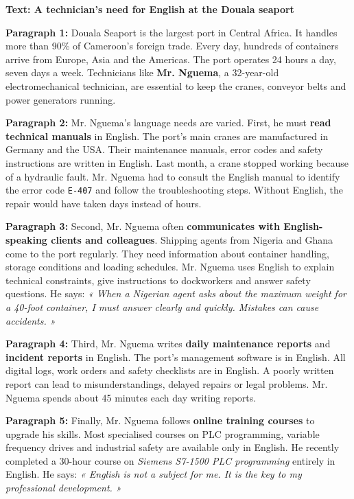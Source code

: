 \documentclass[11pt]{article}
\newcommand{\cle}[1]{{\popxbold\color{popdark}#1}}
\begin{document}
\begin{popfigure}
\textbf{Text: A technician's need for English at the Douala seaport}

\medskip
\noindent
\textbf{Paragraph 1:} 
Douala Seaport is the largest port in Central Africa. It handles more than 90\% of Cameroon's foreign trade. Every day, hundreds of containers arrive from Europe, Asia and the Americas. The port operates 24 hours a day, seven days a week. Technicians like \textbf{Mr. Nguema}, a 32-year-old electromechanical technician, are essential to keep the cranes, conveyor belts and power generators running.

\medskip
\noindent
\textbf{Paragraph 2:}
Mr. Nguema's \cle{language needs} are varied. First, he must \textbf{read technical manuals} in English. The port's main cranes are manufactured in Germany and the USA. Their maintenance manuals, error codes and safety instructions are written in English. Last month, a crane stopped working because of a hydraulic fault. Mr. Nguema had to consult the English manual to identify the error code \texttt{E-407} and follow the troubleshooting steps. Without English, the repair would have taken days instead of hours.

\medskip
\noindent
\textbf{Paragraph 3:}
Second, Mr. Nguema often \textbf{communicates with English-speaking clients and colleagues}. Shipping agents from Nigeria and Ghana come to the port regularly. They need information about container handling, storage conditions and loading schedules. Mr. Nguema uses English to explain technical constraints, give instructions to dockworkers and answer safety questions. He says: \emph{« When a Nigerian agent asks about the maximum weight for a 40-foot container, I must answer clearly and quickly. Mistakes can cause accidents. »}

\medskip
\noindent
\textbf{Paragraph 4:}
Third, Mr. Nguema writes \textbf{daily maintenance reports} and \textbf{incident reports} in English. The port's management software is in English. All digital logs, work orders and safety checklists are in English. A poorly written report can lead to misunderstandings, delayed repairs or legal problems. Mr. Nguema spends about 45 minutes each day writing reports.

\medskip
\noindent
\textbf{Paragraph 5:}
Finally, Mr. Nguema follows \textbf{online training courses} to upgrade his skills. Most specialised courses on PLC programming, variable frequency drives and industrial safety are available only in English. He recently completed a 30-hour course on \emph{Siemens S7-1500 PLC programming} entirely in English. He says: \emph{« English is not a subject for me. It is the key to my professional development. »}


\end{popfigure}
\end{document}
